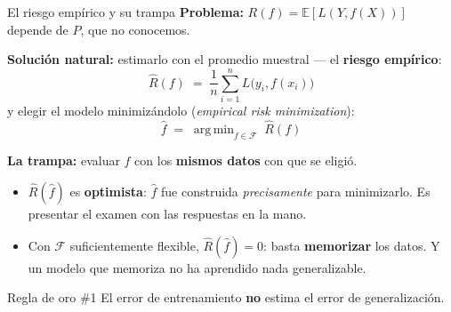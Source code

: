 \documentclass{beamer}
\newcommand{\E}{\mathbb{E}}
\newcommand{\1}{\mathbb{I}}
\DeclareMathOperator*{\argmin}{arg\,min}
\begin{document}
\begin{frame}{El riesgo empírico y su trampa}
\small
\textbf{Problema:} $R(f) = \E[L(Y, f(X))]$ depende de $P$, que no conocemos.
\pause

\vspace{0.1cm}
\textbf{Solución natural:} estimarlo con el promedio muestral --- el \textbf{riesgo empírico}:
\[ \hat{R}(f) \;=\; \frac{1}{n} \sum_{i=1}^{n} L\big(y_i, f(x_i)\big) \]
y elegir el modelo minimizándolo (\emph{empirical risk minimization}):
\[ \hat{f} \;=\; \argmin_{f \in \mathcal{F}} \; \hat{R}(f) \]
\pause

\textbf{La trampa:} evaluar $\hat{f}$ con los \textbf{mismos datos} con que se eligió.
\begin{itemize}\itemsep4pt
  \item $\hat{R}(\hat{f})$ es \textbf{optimista}: $\hat{f}$ fue construida \emph{precisamente} para minimizarlo. Es presentar el examen con las respuestas en la mano. \pause
  \item Con $\mathcal{F}$ suficientemente flexible, $\hat{R}(\hat{f}) = 0$: basta \textbf{memorizar} los datos. Y un modelo que memoriza no ha aprendido nada generalizable.
\end{itemize}
\pause

\begin{block}{Regla de oro \#1}
El error de entrenamiento \textbf{no} estima el error de generalización.
\end{block}
\end{frame}
\end{document}
